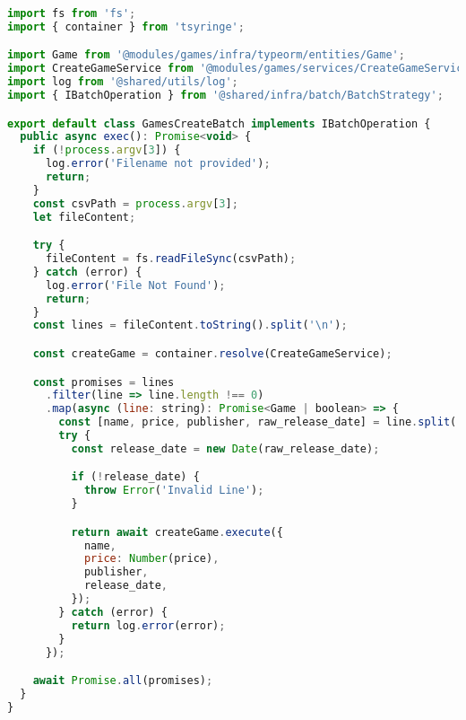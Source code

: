 \begin{lstlisting}[language=JavaScript, caption={GamesCreateBatch.ts},captionpos=b, label=alg:gamescreatebatch]
import fs from 'fs';
import { container } from 'tsyringe';

import Game from '@modules/games/infra/typeorm/entities/Game';
import CreateGameService from '@modules/games/services/CreateGameService';
import log from '@shared/utils/log';
import { IBatchOperation } from '@shared/infra/batch/BatchStrategy';

export default class GamesCreateBatch implements IBatchOperation {
  public async exec(): Promise<void> {
    if (!process.argv[3]) {
      log.error('Filename not provided');
      return;
    }
    const csvPath = process.argv[3];
    let fileContent;

    try {
      fileContent = fs.readFileSync(csvPath);
    } catch (error) {
      log.error('File Not Found');
      return;
    }
    const lines = fileContent.toString().split('\n');

    const createGame = container.resolve(CreateGameService);

    const promises = lines
      .filter(line => line.length !== 0)
      .map(async (line: string): Promise<Game | boolean> => {
        const [name, price, publisher, raw_release_date] = line.split(',');
        try {
          const release_date = new Date(raw_release_date);

          if (!release_date) {
            throw Error('Invalid Line');
          }

          return await createGame.execute({
            name,
            price: Number(price),
            publisher,
            release_date,
          });
        } catch (error) {
          return log.error(error);
        }
      });

    await Promise.all(promises);
  }
}
\end{lstlisting}